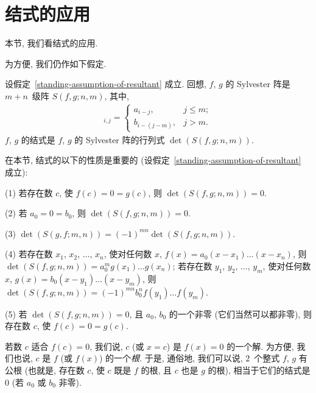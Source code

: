 \documentclass[../libro.tex]{subfiles}
\begin{document}
\section{结式的应用}

本节, 我们看结式的应用.

为方便, 我们仍作如下假定.

\AssumptionResultant*

设假定~\ref{standing-assumption-of-resultant} 成立.
回想, \(f\), \(g\) 的 Sylvester 阵是 \(m + n\)~级阵
\(S(f, g; n, m)\),
其中,
\begin{align*}
    [S(f, g; n, m)]_{i,j} =
    \begin{cases}
        a_{i-j},     & j \leq m; \\
        b_{i-(j-m)}, & j > m.
    \end{cases}
\end{align*}
\(f\), \(g\) 的结式是
\(f\), \(g\) 的 Sylvester 阵的行列式
\(\det {(S(f, g; n, m))}\).

在本节, 结式的以下的性质是重要的
(设假定~\ref{standing-assumption-of-resultant} 成立):

(1)
若存在数 \(c\), 使 \(f(c) = 0 = g(c)\),
则 \(\det {(S(f, g; n, m))} = 0\).

(2)
若 \(a_0 = 0 = b_0\),
则 \(\det {(S(f, g; n, m))} = 0\).

(3)
\(\det {(S(g, f; m, n))} = (-1)^{m n} \det {(S(f, g; n, m))}\).

(4)
若存在数 \(x_1\), \(x_2\), \(\dots\), \(x_n\),
使对任何数 \(x\),
\(f(x) = a_0 (x - x_1) \dots (x - x_n)\),
则 \(\det {(S(f, g; n, m))} = a_0^m g(x_1) \dots g(x_n)\);
若存在数 \(y_1\), \(y_2\), \(\dots\), \(y_m\),
使对任何数 \(x\),
\(g(x) = b_0 (x - y_1) \dots (x - y_m)\),
则 \(\det {(S(f, g; n, m))} = (-1)^{m n} b_0^n f(y_1) \dots f(y_m)\).

(5)
若 \(\det {(S(f, g; n, m))} = 0\),
且 \(a_0\), \(b_0\) 的一个非零
(它们当然可以都非零),
则存在数 \(c\), 使 \(f(c) = 0 = g(c)\).

若数 \(c\) 适合 \(f(c) = 0\),
我们说, \(c\) (或 \(x = c\)) 是 \(f(x) = 0\) 的一个解.
为方便, 我们也说, \(c\) 是 \(f\) (或 \(f(x)\)) 的一个\emph{根}.
于是, 通俗地, 我们可以说,
\(2\)~个整式 \(f\), \(g\) 有公根
(也就是, 存在数 \(c\), 使 \(c\) 既是 \(f\) 的根,
且 \(c\) 也是 \(g\) 的根),
相当于它们的结式是 \(0\)
(若 \(a_0\) 或 \(b_0\) 非零).
\end{document}

